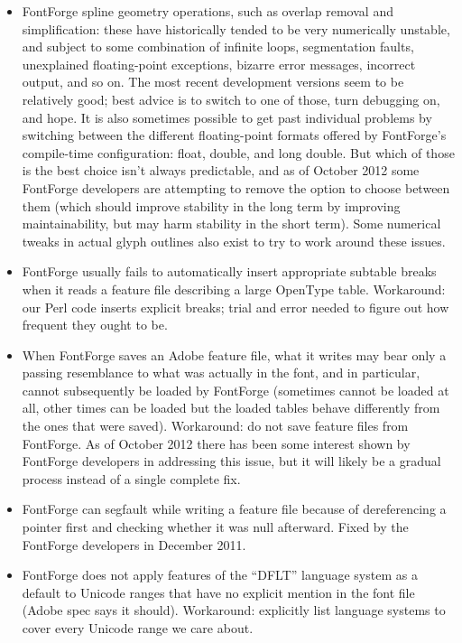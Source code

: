 \documentclass[14pt]{extarticle}
\begin{document}
\begin{itemize}
  \item FontForge spline geometry operations, such as overlap removal and
    simplification: these have historically tended to be very numerically
    unstable, and subject to some combination of infinite loops,
    segmentation faults, unexplained floating-point exceptions, bizarre
    error messages, incorrect output, and so on.  The most recent
    development versions seem to be relatively good; best advice is to
    switch to one of those, turn debugging on, and hope.  It is also
    sometimes possible to get past individual problems by switching between
    the different floating-point formats offered by FontForge's compile-time
    configuration: float, double, and long double.  But which of those is
    the best choice isn't always predictable, and as of October 2012 some
    FontForge developers are attempting to remove the option to choose
    between them (which should improve stability in the long term by
    improving maintainability, but may harm stability in the short term). 
    Some numerical tweaks in actual glyph outlines also exist to try to work
    around these issues.

  \item FontForge usually fails to automatically insert appropriate
    subtable breaks when it reads a feature file describing a large
    OpenType table.  Workaround:  our Perl code inserts explicit breaks;
    trial and error needed to figure out how frequent they ought to be.

  \item When FontForge saves an Adobe feature file, what it writes may bear
    only a passing resemblance to what was actually in the font, and in
    particular, cannot subsequently be loaded by FontForge (sometimes cannot
    be loaded at all, other times can be loaded but the loaded tables behave
    differently from the ones that were saved).  Workaround:  do not save
    feature files from FontForge.  As of October 2012 there has been some
    interest shown by FontForge developers in addressing this issue, but it
    will likely be a gradual process instead of a single complete fix.

  \item FontForge can segfault while writing a feature file because of
    dereferencing a pointer first and checking whether it was null
    afterward.  Fixed by the FontForge developers in December 2011.

  \item FontForge does not apply features of the ``DFLT'' language system as
    a default to Unicode ranges that have no explicit mention in the font
    file (Adobe spec says it should).  Workaround: explicitly list language
    systems to cover every Unicode range we care about.


\end{itemize}
\end{document}
